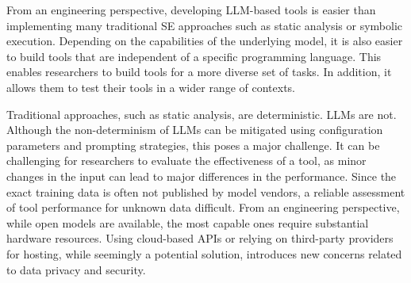 From an engineering perspective, developing LLM-based tools is easier than implementing many traditional SE approaches such as static analysis or symbolic execution.
Depending on the capabilities of the underlying model, it is also easier to build tools that are independent of a specific programming language.
This enables researchers to build tools for a more diverse set of tasks.
In addition, it allows them to test their tools in a wider range of contexts.


Traditional approaches, such as static analysis, are deterministic. LLMs are not.
Although the non-determinism of LLMs can be mitigated using configuration parameters and prompting strategies, this poses a major challenge.
It can be challenging for researchers to evaluate the effectiveness of a tool, as minor changes in the input can lead to major differences in the performance.
Since the exact training data is often not published by model vendors, a reliable assessment of tool performance for unknown data difficult.
From an engineering perspective, while open models are available, the most capable ones require substantial hardware resources.
Using cloud-based APIs or relying on third-party providers for hosting, while seemingly a potential solution, introduces new concerns related to data privacy and security.
